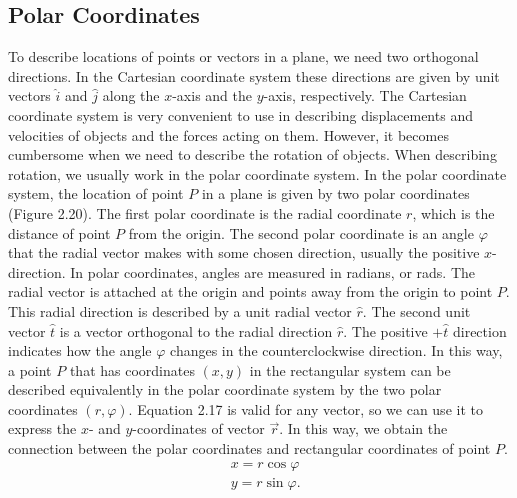 \documentclass{report}
\begin{document}
        \pagebreak \bigbreak \noindent 


        \bigbreak \noindent 
        \subsection{Polar Coordinates}
        \bigbreak \noindent 
        To describe locations of points or vectors in a plane, we need two orthogonal directions. In the Cartesian coordinate system these directions are given by unit vectors $\hat{i}$ and $\hat{j}$ along the $x$-axis and the $y$-axis, respectively. The Cartesian coordinate system is very convenient to use in describing displacements and velocities of objects and the forces acting on them. However, it becomes cumbersome when we need to describe the rotation of objects. When describing rotation, we usually work in the polar coordinate system.
        \bigbreak \noindent 
        In the polar coordinate system, the location of point $P$ in a plane is given by two polar coordinates (Figure 2.20). The first polar coordinate is the radial coordinate $r$, which is the distance of point $P$ from the origin. The second polar coordinate is an angle $\varphi$ that the radial vector makes with some chosen direction, usually the positive $x$-direction. In polar coordinates, angles are measured in radians, or rads. The radial vector is attached at the origin and points away from the origin to point $P$. This radial direction is described by a unit radial vector $\hat{r}$. The second unit vector $\hat{t}$ is a vector orthogonal to the radial direction $\hat{r}$. The positive $+\hat{t}$ direction indicates how the angle $\varphi$ changes in the counterclockwise direction. In this way, a point $P$ that has coordinates $(x, y)$ in the rectangular system can be described equivalently in the polar coordinate system by the two polar coordinates $(r,\varphi)$. Equation 2.17 is valid for any vector, so we can use it to express the $x$- and $y$-coordinates of vector $\vec{r}$. In this way, we obtain the connection between the polar coordinates and rectangular coordinates of point $P$.
        \begin{align*}
            &x = r\cos{\varphi} \\
            &y = r\sin{\varphi}
        .\end{align*}
\end{document}
